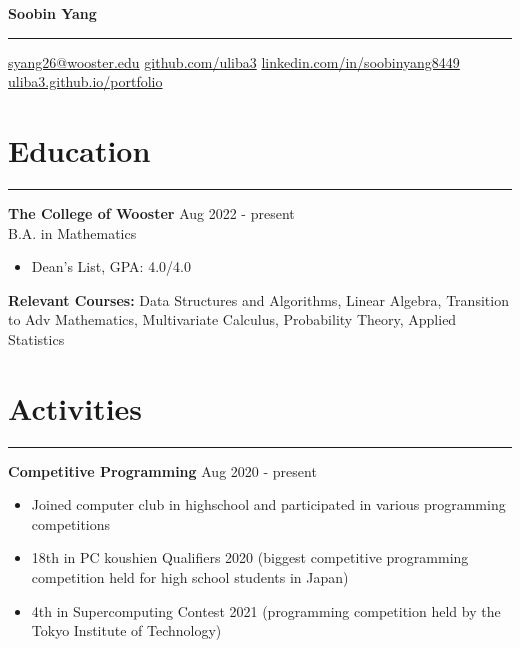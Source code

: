 \documentclass[a4paper,12pt]{article}
\begin{document}
\linespread{1}\selectfont
{}
\newcommand{\sectionrule}[1]{%
  \section*{#1}%
  \hrule%
  \vspace{5pt}%
}
\pagestyle{empty}

\begin{center}
    \textbf{\LARGE Soobin Yang}
    \vspace{5pt}
    \hrule
    \vspace{5pt}
    \faEnvelope \hspace{1pt} \href{mailto:syang26@wooster.edu}
    {syang26@wooster.edu}  \hspace{5pt}
    \faGithubSquare \hspace{1pt} \href{https://github.com/uliba3}
    {github.com/uliba3}  \hspace{5pt}
    \faLinkedinSquare \hspace{1pt} \href{https://linkedin.com/in/soobinyang8449}
    {linkedin.com/in/soobinyang8449}\\
    \faGlobe \hspace{1pt} \href{https://uliba3.github.io/portfolio/}
    {uliba3.github.io/portfolio} 
\end{center}

\sectionrule{Education}
\textbf{The College of Wooster} \hfill \textnormal{Aug 2022 - present}\\
\textnormal{B.A. in Mathematics}
\begin{itemize}
    \item Dean's List, GPA: 4.0/4.0
\end{itemize}
\textbf{Relevant Courses:} 
\textnormal{Data Structures and Algorithms, Linear Algebra, Transition to Adv Mathematics, 
Multivariate Calculus, Probability Theory, Applied Statistics}

\sectionrule{Activities}
\textbf{Competitive Programming} \hfill \textnormal{Aug 2020 - present}
\begin{itemize}
    \item Joined computer club in highschool and participated in various programming competitions
    \item 18th in PC koushien Qualifiers 2020 (biggest competitive programming competition held for high school students in Japan)
    \item 4th in Supercomputing Contest 2021 (programming competition held by the Tokyo Institute of Technology)
\end{itemize}
\end{document}
